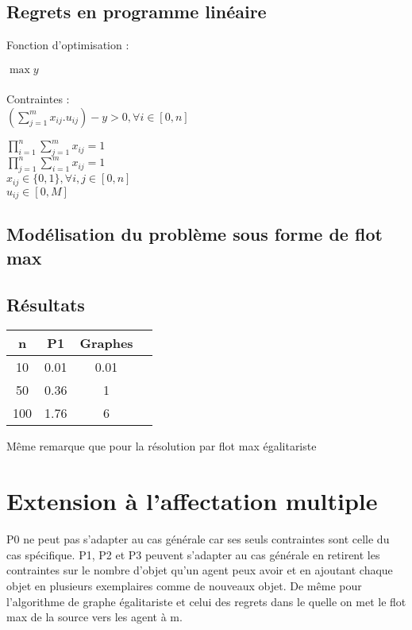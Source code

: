 \documentclass[paper=a4, fontsize=11pt]{scrartcl} %
\numberwithin{equation}{section} %
\numberwithin{figure}{section} %
\numberwithin{table}{section} %
\begin{document}
\subsection{Regrets en programme lin\'eaire}

Fonction d'optimisation : \\\\
$\max y$\\\\
Contraintes :\\

$(\sum_{j=1}^{m}x_{ij}.u_{ij})-y > 0, \forall i \in [0,n]$

$\prod_{i=1}^{n}\sum_{j=1}^{m}x_{ij} = 1$\\
$\prod_{j=1}^{n}\sum_{i=1}^{m}x_{ij} = 1$\\
$x_{ij}\in\{0,1\}, \forall i,j\in[0,n]$\\
$u_{ij}\in[0,M]$


\subsection{Mod\'elisation du probl\`eme sous forme de flot max}


\subsection{R\'esultats}

\begin{tabular}{|*{4}{c|}}
    \hline
     n  & P1  & Graphes\\
    \hline
     10  & 0.01  & 0.01\\
    \hline
     50  & 0.36  & 1\\
    \hline
     100  & 1.76  & 6\\
    \hline
\end{tabular}

M\^eme remarque que pour la r\'esolution par flot max \'egalitariste


\newpage
\section{Extension \`a l'affectation multiple}

P0 ne peut pas s'adapter au cas générale car ses seuls contraintes sont celle du cas spécifique.
P1, P2 et P3 peuvent s'adapter au cas générale en retirent les contraintes sur le nombre d'objet qu'un agent peux avoir et en ajoutant chaque objet en plusieurs exemplaires comme de nouveaux objet.
De même pour l'algorithme de graphe égalitariste et celui des regrets dans le quelle on met le flot max de la source vers les agent à m.
\end{document}
